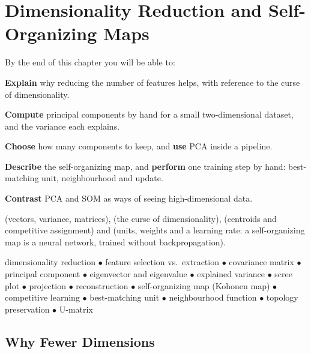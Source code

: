 \chapter{Dimensionality Reduction and Self-Organizing Maps}\label{ch:pcasom}

\begin{outcomes}
By the end of this chapter you will be able to:
\begin{tight}
  \item \textbf{Explain} why reducing the number of features helps, with reference to
        the curse of dimensionality.
  \item \textbf{Compute} principal components by hand for a small two-dimensional
        dataset, and the variance each explains.
  \item \textbf{Choose} how many components to keep, and \textbf{use} PCA inside a
        pipeline.
  \item \textbf{Describe} the self-organizing map, and \textbf{perform} one training
        step by hand: best-matching unit, neighbourhood and update.
  \item \textbf{Contrast} PCA and SOM as ways of seeing high-dimensional data.
\end{tight}
\end{outcomes}

\begin{prereq}
 (vectors, variance, matrices),  (the curse of
dimensionality),  (centroids and competitive assignment) and
 (units, weights and a learning rate: a self-organizing map is a neural
network, trained without backpropagation).
\end{prereq}

\begin{keyterms}
dimensionality reduction $\bullet$ feature selection vs.\ extraction $\bullet$
covariance matrix $\bullet$ principal component $\bullet$ eigenvector and
eigenvalue $\bullet$ explained variance $\bullet$ scree plot $\bullet$ projection
$\bullet$ reconstruction $\bullet$ self-organizing map (Kohonen map) $\bullet$
competitive learning $\bullet$ best-matching unit $\bullet$ neighbourhood function
$\bullet$ topology preservation $\bullet$ U-matrix
\end{keyterms}

\section{Why Fewer Dimensions}


